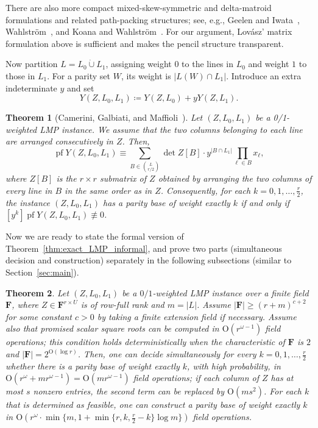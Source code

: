 \documentclass[11pt, a4paper]{article}
\theoremstyle{plain}
\newtheorem{theorem}{Theorem}[section]
\theoremstyle{definition}
\theoremstyle{remark}
\newcommand{\bF}{\mathbf{F}}
\DeclareMathOperator{\pf}{pf}
\begin{document}
There are also more compact mixed-skew-symmetric and delta-matroid formulations and related path-packing structures; see, e.g., Geelen and Iwata~\cite{GeelenIwata2005}, Wahlstr\"om~\cite{Wahlstrom2024}, and Koana and Wahlstr\"om~\cite{KoanaWahlstrom2025}.
For our argument, Lov\'{a}sz' matrix formulation above is sufficient and makes the pencil structure transparent.

Now partition $L=L_0\mathbin{\dot\cup}L_1$, assigning weight $0$ to the lines in $L_0$ and weight $1$ to those in $L_1$.
For a parity set $W$, its weight is $|L(W)\cap L_1|$.
Introduce an extra indeterminate $y$ and set
\[Y(Z,L_0,L_1) \coloneqq Y(Z,L_0)+yY(Z,L_1).\]

\begin{theorem}[Camerini, Galbiati, and Maffioli~\cite{CGM1992}]\label{thm:CGM}
Let $(Z, L_0, L_1)$ be a 0/1-weighted LMP instance.
We assume that the two columns belonging to each line are arranged consecutively in $Z$. 
Then, 
\[\pf Y(Z,L_0,L_1) \equiv \sum_{B \in \binom{L}{r/2}} \det Z[B] \cdot y^{|B\cap L_1|} \prod_{\ell\in B}x_\ell,\]
where $Z[B]$ is the $r\times r$ submatrix of $Z$ obtained by arranging the two columns of every line in $B$ in the same order as in $Z$. 
Consequently, for each $k=0,1,\dots,\frac{r}{2}$, the instance $(Z, L_0, L_1)$ has a parity base of weight exactly $k$ if and only if $[y^k]\pf Y(Z,L_0,L_1)\not\equiv0$.
\end{theorem}

Now we are ready to state the formal version of Theorem~\ref{thm:exact_LMP_informal}, and prove two parts (simultaneous decision and construction) separately in the following subsections (similar to Section~\ref{sec:main}).

\begin{theorem}\label{thm:exact_LMP}
Let $(Z,L_0,L_1)$ be a $0/1$-weighted LMP instance over a finite field $\mathbf{F}$, where $Z\in\bF^{r\times U}$ is of row-full rank and $m=|L|$.
Assume $|\bF| \ge (r + m)^{c + 2}$ for some constant $c > 0$ by taking a finite extension field if necessary.
Assume also that promised scalar square roots can be computed in $\mathrm{O}(r^{\omega - 1})$ field operations; this condition holds deterministically when the characteristic of $\bF$ is $2$ and $|\bF| = 2^{\mathrm{O}(\log r)}$.
Then, one can decide simultaneously for every $k = 0, 1, \dots, \frac{r}{2}$ whether there is a parity base of weight exactly $k$, with high probability, in $\mathrm{O}(r^\omega+mr^{\omega - 1}) = \mathrm{O}(mr^{\omega - 1})$ field operations; if each column of $Z$ has at most $s$ nonzero entries, the second term can be replaced by $\mathrm{O}(ms^2)$.
For each $k$ that is determined as feasible, one can construct a parity base of weight exactly $k$ in $\mathrm{O}(r^\omega \cdot \min\{m, 1 + \min\{r, k, \frac{r}{2} - k\} \log m\})$ field operations.
\end{theorem}
\end{document}
